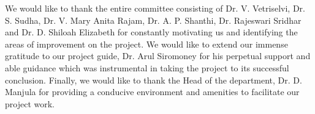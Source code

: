 We would like to thank the entire committee consisting of Dr. V. Vetriselvi, Dr. S. Sudha, Dr. V. Mary Anita Rajam, Dr. A. P. Shanthi, Dr. Rajeswari Sridhar and Dr. D. Shiloah Elizabeth for constantly motivating us and identifying the areas of improvement on the project. We would like to extend our immense gratitude to our project guide, Dr. Arul Siromoney for his perpetual support and able guidance which was instrumental in taking the project to its successful conclusion. Finally, we would like to thank the Head of the department, Dr. D. Manjula for providing a conducive environment and amenities to facilitate our project work.